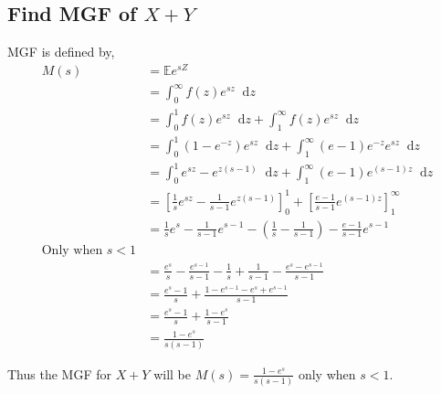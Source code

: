 \documentclass{article}
\newcommand{\diff}{\mathop{}\!\mathrm{d}}
\newcommand{\expect}{\mathbb{E}}
\begin{document}
\subsection{Find MGF of $X+Y$}
MGF is defined by,
\begin{align*}
    M(s) &= \expect e^{sZ} \\
    &= \int_0^\infty f(z) e^{sz} \diff z \\
    &= \int_0^1 f(z) e^{sz} \diff z + \int_1^\infty f(z) e^{sz} \diff z \\
    &= \int_0^1 (1 - e^{-z}) e^{sz} \diff z
    + \int_1^\infty (e - 1) e^{-z} e^{sz} \diff z \\
    &= \int_0^1 e^{sz} - e^{z(s-1)} \diff z
    + \int_1^\infty (e - 1) e^{(s-1)z} \diff z \\
    &= \left[ \frac{1}{s} e^{sz} - \frac{1}{s-1} e^{z(s-1)} \right]_0^1
    + \left[ \frac{e - 1}{s - 1} e^{(s-1)z} \right]_1^\infty \\
    &= \frac{1}{s} e^{s} - \frac{1}{s-1} e^{s-1} - \left( \frac{1}{s} - \frac{1}{s-1} \right)
    - \frac{e - 1}{s - 1} e^{s-1} \\
    \text{Only when $s < 1$} \\
    &= \frac{e^{s}}{s} - \frac{e^{s-1}}{s-1} - \frac{1}{s} + \frac{1}{s-1}
    - \frac{e^{s} - e^{s-1}}{s - 1} \\
    &= \frac{e^{s}-1}{s} + \frac{1 - e^{s-1} - e^{s} + e^{s-1}}{s-1} \\
    &= \frac{e^{s}-1}{s} + \frac{1 - e^{s}}{s-1} \\
    &= \frac{1 - e^{s}}{s(s - 1)}
\end{align*}

Thus the MGF for $X + Y$ will be $M(s) = \frac{1 - e^{s}}{s(s - 1)}$
only when $s < 1$.
\end{document}
